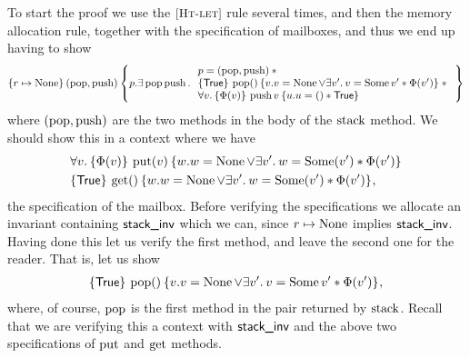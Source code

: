 To start the proof we use the $\ruleref{Ht-let}$ rule 
several times, and then the 
memory allocation rule, together with the specification of mailboxes,
and thus we end up having to show
\begin{align*}
  \hoare{r \pointsto \None}{(\popS, \pushS)}{p. \Exists \popS \pushS . \begin{array}{l}
                                                              p = (\popS, \pushS) \ast{}\\
                                                              \hoare{\TRUE}{\popS\TT}{v.v = \None \lor{} \Exists v' . v = \Some v' \ast \Phi(v')} \ast{}\\
                                                              \All v . \hoare{\Phi(v)}{\pushS v}{u . u = \TT \ast \TRUE}
                                                            \end{array}}
\end{align*}
where $(\operatorname{pop}, \operatorname{push})$ are the two methods in the body of the
$\operatorname{stack}$ method.
We should show this in a context where we have
\begin{align*}
  &\All v. \hoare{\Phi(v)}{\mbput(v)}{w. w = \None \lor{} \Exists v'. w = \Some(v') \ast \Phi(v')}\\
  &\hoare{\TRUE}{\mbget\TT}{w. w = \None \lor{} \Exists v'. w = \Some(v') \ast \Phi(v')},
\end{align*}
the specification of the mailbox.
Before verifying the specifications we allocate an invariant containing $\textsf{\upshape stack\_inv}$ which we can, since $r \mapsto \operatorname{None}$ implies $\textsf{\upshape stack\_inv}$.
Having done this let us verify the first method, and leave the second one for the reader.
That is, let us show
\begin{align*}
  \hoare{\TRUE}{\popS\TT}{v.v = \None \lor{} \Exists v' . v = \Some v' \ast \Phi(v')},
\end{align*}
where, of course, $\operatorname{pop}$ is the first method in the pair returned by
$\operatorname{stack}$.
Recall that we are verifying this a context with $\textsf{\upshape stack\_inv}$ and the above two specifications of $\operatorname{put}$ and $\operatorname{get}$ methods.


